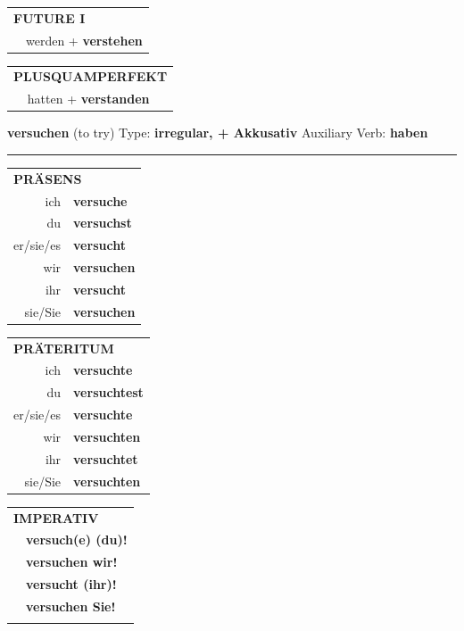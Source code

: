 \documentclass[10pt,a4paper]{revtex4-2}
\begin{document}
\begin{verbbox-acc}
\begin{tabular}{rl}
    \multicolumn{2}{l}{\textbf{FUTURE I} }\\
  &  werden + \textbf{verstehen}\\
 
  \end{tabular}
\hfill
   \begin{tabular}{rl}
      \multicolumn{2}{l}{\textbf{PLUSQUAMPERFEKT}}\\
  &  hatten + \textbf{verstanden}\\
  \end{tabular}
  
  \vspace{-5pt}


\end{verbbox-acc}

\begin{verbbox-acc}
    {\Large \bf versuchen} (to try) \hfill Type: \textbf{irregular, + Akkusativ} \hfill Auxiliary Verb: \textbf{haben} 
    
     \vspace{5pt}

    \hrule
    
    \vspace{5pt}

  \begin{tabular}{rl}
     \multicolumn{2}{l}{\textbf{PRÄSENS} }\\
    ich & \textbf{versuche}\\
    du & \textbf{versuchst}\\
    er/sie/es & \textbf{versucht}\\
    wir & \textbf{versuchen}\\
    ihr & \textbf{versucht}\\
    sie/Sie & \textbf{versuchen}\\
  \end{tabular}
  \hfill
     \begin{tabular}{rl}
    \multicolumn{2}{l}{\textbf{PRÄTERITUM} }\\
    ich & \textbf{versuchte}\\
    du & \textbf{versuchtest}\\
    er/sie/es & \textbf{versuchte}\\
    wir & \textbf{versuchten}\\
    ihr & \textbf{versuchtet}\\
    sie/Sie & \textbf{versuchten}\\
  \end{tabular}
  \hfill
  \begin{tabular}{rl}
     \multicolumn{2}{l}{\textbf{IMPERATIV} }\\
   & \textbf{versuch(e) (du)!}\\
   & \textbf{versuchen wir!}\\
   & \textbf{versucht (ihr)!}\\
   & \textbf{versuchen Sie!}\\
   & \vspace{10pt}
  \end{tabular}


\end{verbbox-acc}
\end{document}
